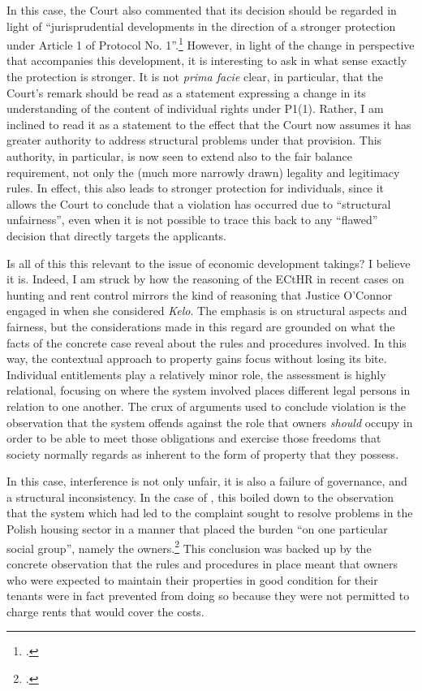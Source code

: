 In this case, the Court also commented that its decision should be regarded in light of ``jurisprudential developments in the direction of a stronger protection under Article 1 of Protocol No. 1''.\footcite[135]{lindheim12} However, in light of the change in perspective that accompanies this development, it is interesting to ask in what sense exactly the protection is stronger. It is not {\it prima facie} clear, in particular, that the Court's remark should be read as a statement expressing a change in its understanding of the content of individual rights under P1(1). Rather, I am inclined to read it as a statement to the effect that the Court now assumes it has greater authority to address structural problems under that provision. This authority, in particular, is now seen to extend also to the fair balance requirement, not only the (much more narrowly drawn) legality and legitimacy rules. In effect, this also leads to stronger protection for individuals, since it allows the Court to conclude that a violation has occurred due to ``structural unfairness'', even when it is not possible to trace this back to any ``flawed'' decision that directly targets the applicants.

Is all of this this relevant to the issue of economic development takings? I believe it is. Indeed, I am struck by how the reasoning of the ECtHR in recent cases on hunting and rent control mirrors the kind of reasoning that Justice O'Connor engaged in when she considered {\it Kelo}. The emphasis is on structural aspects and fairness, but the considerations made in this regard are grounded on what the facts of the concrete case reveal about the rules and procedures involved. In this way, the contextual approach to property gains focus without losing its bite. Individual entitlements play a relatively minor role, the assessment is highly relational, focusing on where the system involved places different legal persons in relation to one another. The crux of arguments used to conclude violation is the observation that the system offends against the role that owners {\it should} occupy in order to be able to meet those obligations and exercise those freedoms that society normally regards as inherent to the form of property that they possess.

In this case, interference is not only unfair, it is also a failure of governance, and a structural inconsistency. In the case of \textcite{hutten06}, this boiled down to the observation that the system which had led to the complaint sought to resolve problems in the Polish housing sector in a manner that placed the burden ``on one particular social group'', namely the owners.\footcite[225]{hutten06} This conclusion was backed up by the concrete observation that the rules and procedures in place meant that owners who were expected to maintain their properties in good condition for their tenants were in fact prevented from doing so because they were not permitted to charge rents that would cover the costs.

